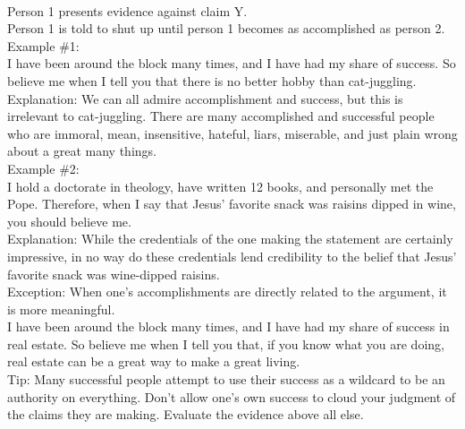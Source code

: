 \documentclass[a4paper,12pt,single,pdftex]{scrbook}
\begin{document}
    
       
    \\

    
      Person 1 presents evidence against claim Y.
    \\

    
      Person 1 is told to shut up until person 1 becomes as accomplished as person 2.
    \\

    
      Example \#1:
    \\

    
      I have been around the block many times, and I have had my share of success.  So believe me when I tell you that there is no better hobby than cat-juggling.
    \\

    
      Explanation: We can all admire accomplishment and success, but this is irrelevant to cat-juggling.  There are many accomplished and successful people who are immoral, mean, insensitive, hateful, liars,  miserable, and just plain wrong about a great many things.
    \\

    
      Example \#2:
    \\

    
      I hold a doctorate in theology, have written 12 books, and personally met the Pope.  Therefore, when I say that Jesus’ favorite snack was raisins dipped in wine, you should believe me.
    \\

    
      Explanation: While the credentials of the one making the statement are certainly impressive, in no way do these credentials lend credibility to the belief that Jesus’ favorite snack was wine-dipped raisins.
    \\

    
      Exception: When one’s accomplishments are directly related to the argument, it is more meaningful.
    \\

    
      I have been around the block many times, and I have had my share of success in real estate.  So believe me when I tell you that, if you know what you are doing, real estate can be a great way to make a great living.
    \\

    
      Tip: Many successful people attempt to use their success as a wildcard to be an authority on everything.  Don’t allow one’s own success to cloud your judgment of the claims they are making.  Evaluate the evidence above all else.
    \\
\end{document}

